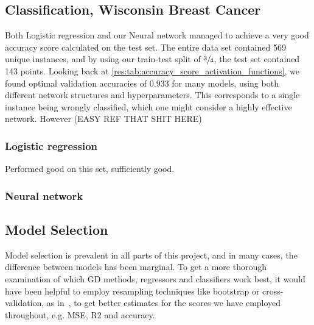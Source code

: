 


\subsection{Classification, Wisconsin Breast Cancer}
    Both Logistic regression and our Neural network managed to achieve a very good accuracy score calculated on the test set. The entire data set contained 569 unique instances, and by using our train-test split of $\sfrac{3}{4}$, the test set contained 143 points. Looking back at \cref{res:tab:accuracy_score_activation_functions}, we found optimal validation accuracies of $0.933$ for many models, using both different network structures and hyperparameters. This corresponds to a single instance being wrongly classified, which one might consider a highly effective network. However (EASY REF THAT SHIT HERE)
    

    \subsubsection{Logistic regression}
        Performed good on this set, sufficiently good.

    \subsubsection{Neural network}

\subsection{Model Selection}
    Model selection is prevalent in all parts of this project, and in many cases, the difference between models has been marginal. To get a more thorough examination of which GD methods, regressors and classifiers work best, it would have been helpful to employ resampling techniques like bootstrap or cross-validation, as in~\citep{Project1}, to get better estimates for the scores we have employed throughout, e.g. MSE, R2 and accuracy.